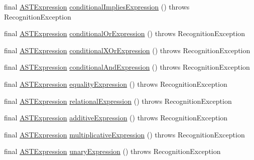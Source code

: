 \begin{DoxyCompactItemize}
\item 
final \hyperlink{classorg_1_1tzi_1_1use_1_1parser_1_1ocl_1_1_a_s_t_expression}{A\-S\-T\-Expression} \hyperlink{classorg_1_1tzi_1_1use_1_1parser_1_1ocl_1_1_o_c_l_parser_aae2f504cabd4c9ea6932336e3cd12d7e}{conditional\-Implies\-Expression} ()  throws Recognition\-Exception 
\item 
final \hyperlink{classorg_1_1tzi_1_1use_1_1parser_1_1ocl_1_1_a_s_t_expression}{A\-S\-T\-Expression} \hyperlink{classorg_1_1tzi_1_1use_1_1parser_1_1ocl_1_1_o_c_l_parser_ad571c24b7d57404d5d021b81a6346b3c}{conditional\-Or\-Expression} ()  throws Recognition\-Exception 
\item 
final \hyperlink{classorg_1_1tzi_1_1use_1_1parser_1_1ocl_1_1_a_s_t_expression}{A\-S\-T\-Expression} \hyperlink{classorg_1_1tzi_1_1use_1_1parser_1_1ocl_1_1_o_c_l_parser_a044cf7858d764d68c780a5dc61a5cc95}{conditional\-X\-Or\-Expression} ()  throws Recognition\-Exception 
\item 
final \hyperlink{classorg_1_1tzi_1_1use_1_1parser_1_1ocl_1_1_a_s_t_expression}{A\-S\-T\-Expression} \hyperlink{classorg_1_1tzi_1_1use_1_1parser_1_1ocl_1_1_o_c_l_parser_aeda29584c87a7d2e2b9c6d5a70524589}{conditional\-And\-Expression} ()  throws Recognition\-Exception 
\item 
final \hyperlink{classorg_1_1tzi_1_1use_1_1parser_1_1ocl_1_1_a_s_t_expression}{A\-S\-T\-Expression} \hyperlink{classorg_1_1tzi_1_1use_1_1parser_1_1ocl_1_1_o_c_l_parser_ace6f3a313420db45e46dfc1366770951}{equality\-Expression} ()  throws Recognition\-Exception 
\item 
final \hyperlink{classorg_1_1tzi_1_1use_1_1parser_1_1ocl_1_1_a_s_t_expression}{A\-S\-T\-Expression} \hyperlink{classorg_1_1tzi_1_1use_1_1parser_1_1ocl_1_1_o_c_l_parser_a402f8d15cc343f91035e70080a045402}{relational\-Expression} ()  throws Recognition\-Exception 
\item 
final \hyperlink{classorg_1_1tzi_1_1use_1_1parser_1_1ocl_1_1_a_s_t_expression}{A\-S\-T\-Expression} \hyperlink{classorg_1_1tzi_1_1use_1_1parser_1_1ocl_1_1_o_c_l_parser_a7285eb2b6a5e62bddee09ab69b55775f}{additive\-Expression} ()  throws Recognition\-Exception 
\item 
final \hyperlink{classorg_1_1tzi_1_1use_1_1parser_1_1ocl_1_1_a_s_t_expression}{A\-S\-T\-Expression} \hyperlink{classorg_1_1tzi_1_1use_1_1parser_1_1ocl_1_1_o_c_l_parser_ad569f7d8e64523f5aa76098e8cc7f124}{multiplicative\-Expression} ()  throws Recognition\-Exception 
\item 
final \hyperlink{classorg_1_1tzi_1_1use_1_1parser_1_1ocl_1_1_a_s_t_expression}{A\-S\-T\-Expression} \hyperlink{classorg_1_1tzi_1_1use_1_1parser_1_1ocl_1_1_o_c_l_parser_a39be3af836adde39abe6329334e1b865}{unary\-Expression} ()  throws Recognition\-Exception 

\end{DoxyCompactItemize}
